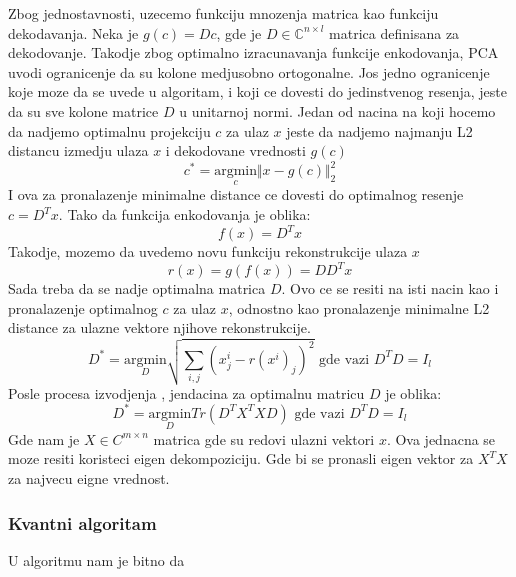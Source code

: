 \documentclass[12pt, letterpaper, oneside]{article}
\begin{document}
Zbog jednostavnosti, uzecemo funkciju mnozenja matrica kao funkciju dekodavanja. Neka je $g(c)=Dc$, gde je
$D \in \mathbb{C}^{n \times l}$ matrica definisana za dekodovanje. Takodje zbog optimalno izracunavanja funkcije enkodovanja, 
PCA uvodi ogranicenje da su kolone medjusobno ortogonalne. Jos jedno ogranicenje koje moze da se uvede u algoritam,
i koji ce dovesti do jedinstvenog resenja, jeste da su sve kolone matrice $D$ u unitarnoj normi.
Jedan od nacina na koji hocemo da nadjemo optimalnu projekciju $c$ za ulaz $x$ jeste da nadjemo najmanju L2 distancu izmedju
ulaza $x$ i dekodovane vrednosti $g(c)$
\[
  c^{*} = \underset{c}{\mathrm{argmin}} \Vert x-g(c) \Vert_2^2
\]
I ova za pronalazenje minimalne distance ce dovesti do optimalnog resenje $c=D^{T}x$\cite{goodfellow2016deep}. Tako da funkcija enkodovanja je oblika:
\[
f(x) = D^Tx  
\]
Takodje, mozemo da uvedemo novu funkciju rekonstrukcije ulaza $x$
\[
  r(x) = g(f(x)) = DD^Tx  
\]
Sada treba da se nadje optimalna matrica $D$. Ovo ce se resiti na isti nacin kao i pronalazenje optimalnog $c$ za ulaz $x$, odnostno kao pronalazenje minimalne L2 distance za ulazne vektore
njihove rekonstrukcije.
\[
    D^{*} =\underset{D}{\mathrm{argmin}} \sqrt{\sum_{i,j}(x^i_j - r(x^i)_j)^2} \text{ gde vazi } D^TD = I_l
\]
Posle procesa izvodjenja \cite{goodfellow2016deep}, jendacina za optimalnu matricu $D$ je oblika:
\[
    D^{*} =\underset{D}{\mathrm{argmin}} Tr(D^TX^TXD) \text{ gde vazi } D^TD = I_l
\] 
Gde nam je $X \in C^{m \times n}$ matrica gde su redovi ulazni vektori $x$. Ova jednacna se moze resiti koristeci eigen dekompoziciju. Gde bi 
se pronasli eigen vektor za $X^TX$ za najvecu eigne vrednost. 
\subsubsection{Kvantni algoritam}
U algoritmu nam je bitno da 

\newpage
\printbibliography
\end{document}
